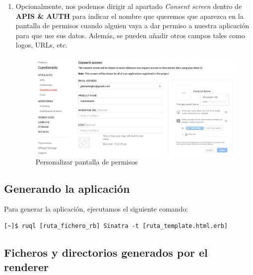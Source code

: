\begin{enumerate}
  \item Opcionalmente, nos podemos dirigir al apartado \textit{Consent screen} dentro de {\bfseries APIS \& AUTH} para indicar el nombre que queremos que aparezca
  en la pantalla de permisos cuando alguien vaya a dar permiso a nuestra aplicaci\'on para que use sus datos. Adem\'as, se pueden a\~{n}adir otros campos tales como
  logos, URLs, etc.
  \begin{figure}[!th]
  \begin{center}
  \includegraphics[width=1.2\textwidth]{images/gdc6.eps}
  \caption{Personalizar pantalla de permisos}
  \label{fig:gdc6}
  \end{center}
  \end{figure}
  
\end{enumerate}
\newpage

\subsection{Generando la aplicaci\'on}
\label{subsec:Apendice2.14}

Para generar la aplicaci\'on, ejecutamos el siguiente comando:
\begin{verbatim}
[~]$ ruql [ruta_fichero_rb] Sinatra -t [ruta_template.html.erb]
\end{verbatim}

\subsection{Ficheros y directorios generados por el renderer}
\label{subsec:Apendice2.15}

